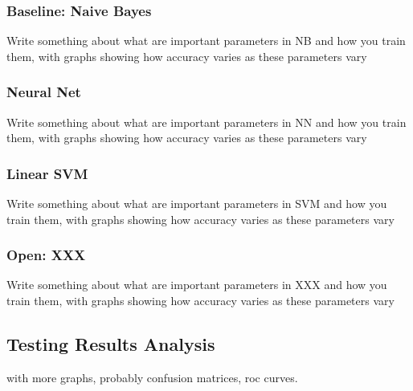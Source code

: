 \documentclass{acm_proc_article-sp}
\begin{document}
\subsubsection{Baseline: Naive Bayes}
Write something about what are important parameters in NB and how you train them, with graphs showing how accuracy varies as these parameters vary

\subsubsection{Neural Net}
Write something about what are important parameters in NN and how you train them, with graphs showing how accuracy varies as these parameters vary

\subsubsection{Linear SVM }
Write something about what are important parameters in SVM and how you train them, with graphs showing how accuracy varies as these parameters vary

\subsubsection{Open: XXX}
Write something about what are important parameters in XXX and how you train them, with graphs showing how accuracy varies as these parameters vary



\subsection{Testing Results Analysis}
with more graphs, probably confusion matrices, roc curves.
\end{document}
